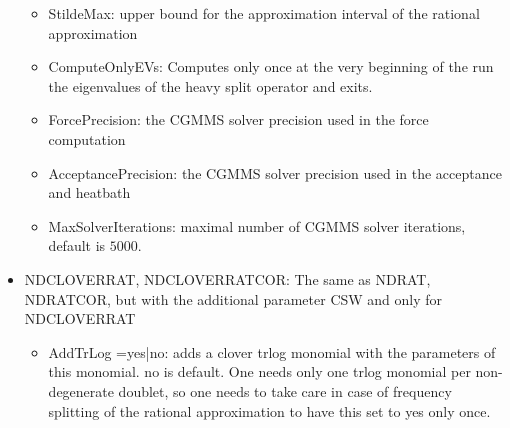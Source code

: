 \begin{itemize}
\begin{itemize}
  \item {\ttfamily StildeMax}:
    upper bound for the approximation interval of the rational approximation
  \item {\ttfamily ComputeOnlyEVs}: Computes only once at the very
    beginning of the run the eigenvalues of the heavy split operator
    and exits.
  \item {\ttfamily ForcePrecision}: the CGMMS solver precision used in the
    force computation
  \item {\ttfamily AcceptancePrecision}: the CGMMS solver precision used in the
    acceptance and heatbath
  \item {\ttfamily MaxSolverIterations}: maximal number of CGMMS
    solver iterations, default is $5000$.
  \end{itemize}
  
\item {\ttfamily NDCLOVERRAT, NDCLOVERRATCOR}:
  The same as {\ttfamily NDRAT, NDRATCOR}, but with the additional
  parameter {\ttfamily CSW} and only for {\ttfamily NDCLOVERRAT}
  \begin{itemize}
  \item {\ttfamily AddTrLog =yes|no}: adds a clover trlog monomial
    with the parameters of this monomial. {\ttfamily no} is
    default. One needs only one trlog monomial per non-degenerate
    doublet, so one needs to take care in case of frequency splitting
    of the rational approximation to have this set to {\ttfamily yes}
    only once.
  \end{itemize}


\end{itemize}
